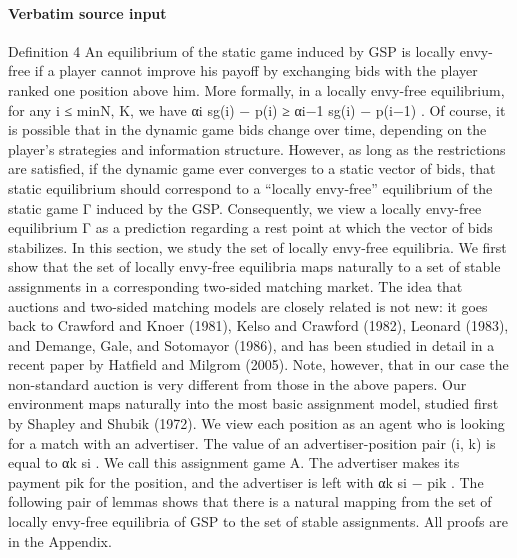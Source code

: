 \documentclass[10pt]{article}
\begin{document}
\paragraph{Verbatim source input}
\begin{ReviewVerbatim}
Definition 4 An equilibrium of the static game induced by GSP is locally envy-free if a player
cannot improve his payoff by exchanging bids with the player ranked one position above him. More
formally, in a locally envy-free equilibrium, for any i ≤ min{N, K}, we have αi sg(i) − p(i) ≥
αi−1 sg(i) − p(i−1) .
Of course, it is possible that in the dynamic game bids change over time, depending on the
player’s strategies and information structure. However, as long as the restrictions are satisfied, if
the dynamic game ever converges to a static vector of bids, that static equilibrium should correspond
to a “locally envy-free” equilibrium of the static game Γ induced by the GSP. Consequently, we
view a locally envy-free equilibrium Γ as a prediction regarding a rest point at which the vector of
bids stabilizes. In this section, we study the set of locally envy-free equilibria.
We first show that the set of locally envy-free equilibria maps naturally to a set of stable
assignments in a corresponding two-sided matching market. The idea that auctions and two-sided
matching models are closely related is not new: it goes back to Crawford and Knoer (1981), Kelso
and Crawford (1982), Leonard (1983), and Demange, Gale, and Sotomayor (1986), and has been
studied in detail in a recent paper by Hatfield and Milgrom (2005). Note, however, that in our case
the non-standard auction is very different from those in the above papers.
Our environment maps naturally into the most basic assignment model, studied first by Shapley
and Shubik (1972). We view each position as an agent who is looking for a match with an advertiser.
The value of an advertiser-position pair (i, k) is equal to αk si . We call this assignment game A.
The advertiser makes its payment pik for the position, and the advertiser is left with αk si − pik .
The following pair of lemmas shows that there is a natural mapping from the set of locally envy-free
equilibria of GSP to the set of stable assignments. All proofs are in the Appendix.
\end{ReviewVerbatim}
\end{document}
